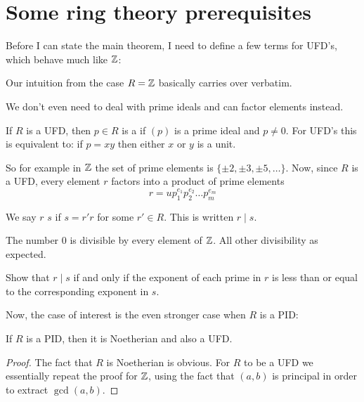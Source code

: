 \section{Some ring theory prerequisites}
Before I can state the main theorem, I need to define a few terms for UFD's,
which behave much like $\ZZ$:
\begin{moral}
	Our intuition from the case $R = \mathbb Z$ basically carries over verbatim.
\end{moral}
We don't even need to deal with prime ideals and can factor elements instead.

\begin{definition}
	If $R$ is a UFD, then $p \in R$ is a 
	if $(p)$ is a prime ideal and $p \neq 0$.
	For UFD's this is equivalent to:
	if $p = xy$ then either $x$ or $y$ is a unit.
\end{definition}
So for example in $\ZZ$ the set of prime elements is $\{\pm2, \pm3, \pm5, \dots\}$.
Now, since $R$ is a UFD, every element $r$ factors into a product of prime elements
\[ r = u p_1^{e_1} p_2^{e_2} \dots p_m^{e_m} \]

\begin{definition}
	We say $r$  $s$ if $s = r'r$
	for some $r' \in R$. This is written $r \mid s$.
\end{definition}
\begin{example}
	[Divisibility in $\ZZ$]
	The number $0$ is divisible by every element of $\ZZ$.
	All other divisibility as expected.
\end{example}
\begin{ques}
	Show that $r \mid s$ if and only if the exponent of each prime in $r$ is
	less than or equal to the corresponding exponent in $s$.
\end{ques}

Now, the case of interest is the even stronger case when $R$ is a PID:
\begin{proposition}
	If $R$ is a PID, then it is Noetherian and also a UFD.
\end{proposition}
\begin{proof}
	The fact that $R$ is Noetherian is obvious.
	For $R$ to be a UFD we essentially repeat the proof for $\ZZ$,
	using the fact that $(a,b)$ is principal in order to extract
	$\gcd(a,b)$.
\end{proof}

